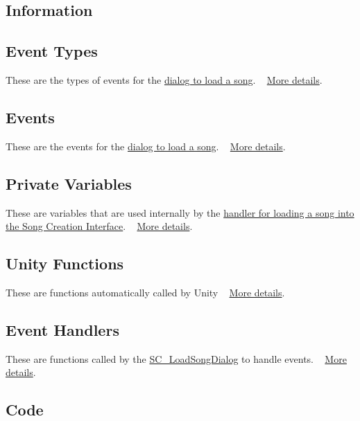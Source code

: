 \hypertarget{group___doc_s_c___l_s_d_DocSC_LSDInfo}{}\subsection{Information}\label{group___doc_s_c___l_s_d_DocSC_LSDInfo}
\hypertarget{group___doc_s_c___l_s_d_DocSC_LSDEventTypes}{}\subsection{Event Types}\label{group___doc_s_c___l_s_d_DocSC_LSDEventTypes}
These are the types of events for the \hyperlink{group___doc_s_c___l_s_d}{dialog to load a song}. ~\newline
 \hyperlink{group___s_c___l_s_d_event_types}{More details}.\hypertarget{group___doc_s_c___l_s_d_DocSC_LSDEvents}{}\subsection{Events}\label{group___doc_s_c___l_s_d_DocSC_LSDEvents}
These are the events for the \hyperlink{group___doc_s_c___l_s_d}{dialog to load a song}. ~\newline
 \hyperlink{group___s_c___l_s_d_events}{More details}.\hypertarget{group___doc_s_c___l_s_d_DocSC_LSDPrivVar}{}\subsection{Private Variables}\label{group___doc_s_c___l_s_d_DocSC_LSDPrivVar}
These are variables that are used internally by the \hyperlink{group___doc_s_c___l_s_d}{handler for loading a song into the Song Creation Interface}. ~\newline
 \hyperlink{group___s_c___l_s_d_priv_var}{More details}.\hypertarget{group___doc_s_c___l_s_d_DocSC_LSDUnity}{}\subsection{Unity Functions}\label{group___doc_s_c___l_s_d_DocSC_LSDUnity}
These are functions automatically called by Unity ~\newline
 \hyperlink{group___s_c___l_s_d_unity}{More details}.\hypertarget{group___doc_s_c___l_s_d_DocSC_LSDHandlers}{}\subsection{Event Handlers}\label{group___doc_s_c___l_s_d_DocSC_LSDHandlers}
These are functions called by the \hyperlink{class_s_c___load_song_dialog}{S\+C\+\_\+\+Load\+Song\+Dialog} to handle events. ~\newline
 \hyperlink{group___s_c___l_s_d_handlers}{More details}.\hypertarget{group___doc_s_c___l_s_d_DocSC_LSDCode}{}\subsection{Code}\label{group___doc_s_c___l_s_d_DocSC_LSDCode}

